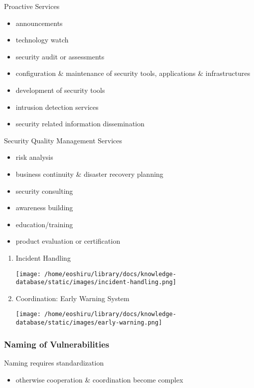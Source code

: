 \documentclass[11pt]{article}
\begin{document}
Proactive Services
\begin{itemize}
\item announcements
\item technology watch
\item security audit or assessments
\item configuration \& maintenance of security tools, applications \& infrastructures
\item development of security tools
\item intrusion detection services
\item security related information dissemination
\end{itemize}

Security Quality Management Services
\begin{itemize}
\item risk analysis
\item business continuity \& disaster recovery planning
\item security consulting
\item awareness building
\item education/training
\item product evaluation or certification
\end{itemize}

\begin{enumerate}
\item Incident Handling
\label{sec:orgb547303}
\begin{center}
\texttt{[image: /home/eoshiru/library/docs/knowledge-database/static/images/incident-handling.png]}
\end{center}

\item Coordination: Early Warning System
\label{sec:org8f5fcd0}
\begin{center}
\texttt{[image: /home/eoshiru/library/docs/knowledge-database/static/images/early-warning.png]}
\end{center}
\end{enumerate}

\subsubsection{Naming of Vulnerabilities}
\label{sec:org26fb7a7}
Naming requires standardization
\begin{itemize}
\item otherwise cooperation \& coordination become complex
\end{itemize}
\end{document}
